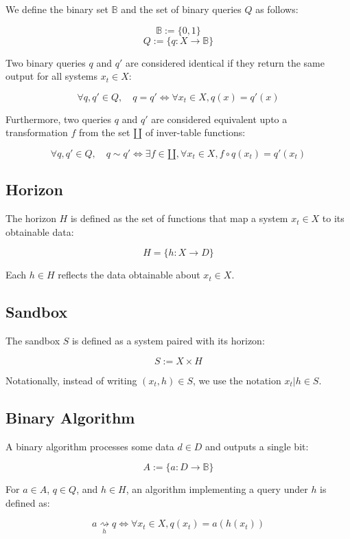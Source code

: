 \documentclass[11pt,a4paper]{article}
\theoremstyle{definition}
\theoremstyle{remark}
\numberwithin{equation}{section}
\begin{document}
We define the binary set $\mathbb{B}$ and the set of binary queries $Q$ as follows:

\[
\mathbb{B} := \{ 0, 1 \}
\]
\[
Q := \{ q : X \rightarrow \mathbb{B} \}
\]

Two binary queries $q$ and $q'$ are considered identical if they return the same output for all systems $x_t \in X$:

\[
\forall q, q' \in Q, \quad q = q' \iff \forall x_t \in X, q(x) = q'(x)
\]

Furthermore, two queries $q$ and $q'$ are considered equivalent upto a transformation $f$ from the set $\amalg$ of inver-table functions:

\[
\forall q, q' \in Q, \quad q \sim q' \iff \exists f \in \amalg, \forall x_t \in X, f \circ q(x_t) = q'(x_t)
\]

\subsection{Horizon}

The horizon $H$ is defined as the set of functions that map a system $x_t \in X$ to its obtainable data:

\[
H = \{ h : X \rightarrow D \}
\]

Each $h \in H$ reflects the data obtainable about $x_t \in X$.

\subsection{Sandbox}

The sandbox $S$ is defined as a system paired with its horizon:

\[
S := X \times H
\]

Notationally, instead of writing $(x_t, h) \in S$, we use the notation $x_t | h \in S$.

\subsection{Binary Algorithm}

A binary algorithm processes some data $d \in D$ and outputs a single bit:

\[
A := \{ a : D \rightarrow \mathbb{B} \}
\]

For $a \in A$, $q \in Q$, and $h \in H$,  an algorithm implementing a query under $h$ is defined as:

\[
a \underset{h}{\rightsquigarrow} q \iff \forall x_t \in X, q(x_t) = a(h(x_t))
\]
\end{document}
